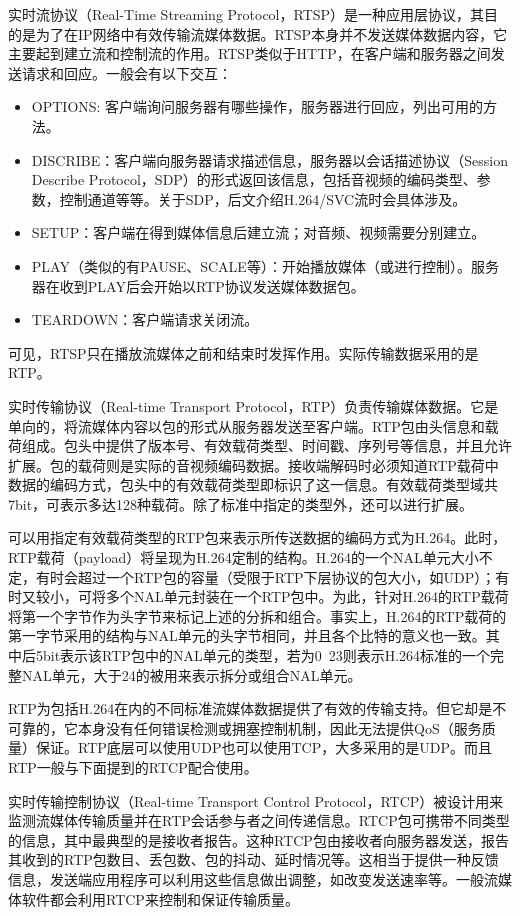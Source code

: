 实时流协议（Real-Time Streaming Protocol，RTSP）是一种应用层协议，其目的是为了在IP网络中有效传输流媒体数据。RTSP本身并不发送媒体数据内容，它主要起到建立流和控制流的作用。RTSP类似于HTTP，在客户端和服务器之间发送请求和回应。一般会有以下交互：
\begin{itemize}
\item OPTIONS: 客户端询问服务器有哪些操作，服务器进行回应，列出可用的方法。
\item DISCRIBE：客户端向服务器请求描述信息，服务器以会话描述协议（Session Describe Protocol，SDP）的形式返回该信息，包括音视频的编码类型、参数，控制通道等等。关于SDP，后文介绍H.264/SVC流时会具体涉及。
\item SETUP：客户端在得到媒体信息后建立流；对音频、视频需要分别建立。
\item PLAY（类似的有PAUSE、SCALE等）：开始播放媒体（或进行控制）。服务器在收到PLAY后会开始以RTP协议发送媒体数据包。
\item TEARDOWN：客户端请求关闭流。
\end{itemize}

可见，RTSP只在播放流媒体之前和结束时发挥作用。实际传输数据采用的是RTP。

实时传输协议（Real-time Transport Protocol，RTP）负责传输媒体数据。它是单向的，将流媒体内容以包的形式从服务器发送至客户端。RTP包由头信息和载荷组成\supercite{RTP}。包头中提供了版本号、有效载荷类型、时间戳、序列号等信息，并且允许扩展。包的载荷则是实际的音视频编码数据。接收端解码时必须知道RTP载荷中数据的编码方式，包头中的有效载荷类型即标识了这一信息。有效载荷类型域共7bit，可表示多达128种载荷。除了标准中指定的类型外，还可以进行扩展。

可以用指定有效载荷类型的RTP包来表示所传送数据的编码方式为H.264。此时，RTP载荷（payload）将呈现为H.264定制的结构\supercite{RTP-H.264}。H.264的一个NAL单元大小不定，有时会超过一个RTP包的容量（受限于RTP下层协议的包大小，如UDP）；有时又较小，可将多个NAL单元封装在一个RTP包中。为此，针对H.264的RTP载荷将第一个字节作为头字节来标记上述的分拆和组合。事实上，H.264的RTP载荷的第一字节采用的结构与NAL单元的头字节相同，并且各个比特的意义也一致。其中后5bit表示该RTP包中的NAL单元的类型，若为0~23则表示H.264标准的一个完整NAL单元，大于24的被用来表示拆分或组合NAL单元。

RTP为包括H.264在内的不同标准流媒体数据提供了有效的传输支持。但它却是不可靠的，它本身没有任何错误检测或拥塞控制机制，因此无法提供QoS（服务质量）保证。RTP底层可以使用UDP也可以使用TCP，大多采用的是UDP。而且RTP一般与下面提到的RTCP配合使用。

实时传输控制协议（Real-time Transport Control Protocol，RTCP）被设计用来监测流媒体传输质量并在RTP会话参与者之间传递信息。RTCP包可携带不同类型的信息，其中最典型的是接收者报告。这种RTCP包由接收者向服务器发送，报告其收到的RTP包数目、丢包数、包的抖动、延时情况等。这相当于提供一种反馈信息，发送端应用程序可以利用这些信息做出调整，如改变发送速率等。一般流媒体软件都会利用RTCP来控制和保证传输质量。

